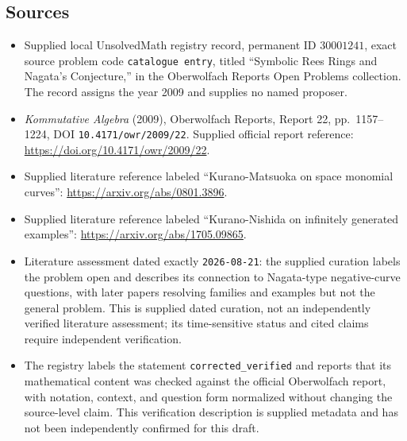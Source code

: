 \documentclass[11pt]{article}
\begin{document}
\subsection{Sources}
\begin{itemize}
\item Supplied local UnsolvedMath registry record, permanent ID \(30001241\), exact source problem code \texttt{catalogue entry}, titled ``Symbolic Rees Rings and Nagata's Conjecture,'' in the Oberwolfach Reports Open Problems collection. The record assigns the year 2009 and supplies no named proposer.
\item \emph{Kommutative Algebra} (2009), Oberwolfach Reports, Report 22, pp.\ 1157--1224, DOI \texttt{10.4171/owr/2009/22}. Supplied official report reference: \url{https://doi.org/10.4171/owr/2009/22}.
\item Supplied literature reference labeled ``Kurano-Matsuoka on space monomial curves'': \url{https://arxiv.org/abs/0801.3896}.
\item Supplied literature reference labeled ``Kurano-Nishida on infinitely generated examples'': \url{https://arxiv.org/abs/1705.09865}.
\item Literature assessment dated exactly \texttt{2026-08-21}: the supplied curation labels the problem open and describes its connection to Nagata-type negative-curve questions, with later papers resolving families and examples but not the general problem. This is supplied dated curation, not an independently verified literature assessment; its time-sensitive status and cited claims require independent verification.
\item The registry labels the statement \texttt{corrected\_verified} and reports that its mathematical content was checked against the official Oberwolfach report, with notation, context, and question form normalized without changing the source-level claim. This verification description is supplied metadata and has not been independently confirmed for this draft.
\end{itemize}
\end{document}
